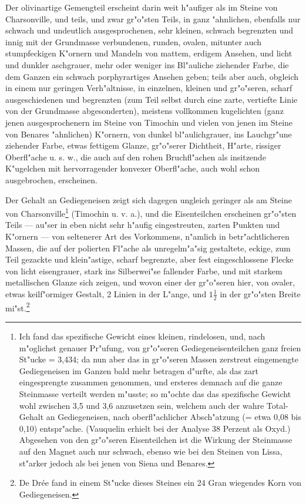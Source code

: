 \documentclass[a4paper, 11pt, oneside, german]{article}
\begin{document}
Der olivinartige Gemengteil erscheint darin weit h"aufiger als im Steine von Charsonville, und teils, und zwar gr"o"sten Teils, in ganz "ahnlichen, ebenfalls nur schwach und undeutlich ausgesprochenen, sehr kleinen, schwach begrenzten und innig mit der Grundmasse verbundenen, runden, ovalen, mitunter auch stumpfeckigen K"ornern und Mandeln von mattem, erdigem Ansehen, und licht und dunkler aschgrauer, mehr oder weniger ins Bl"auliche ziehender Farbe, die dem Ganzen ein schwach porphyrartiges Ansehen geben; teils aber auch, obgleich in einem nur geringen Verh"altnisse, in einzelnen, kleinen und gr"o"seren, scharf ausgeschiedenen und begrenzten (zum Teil selbst durch eine zarte, vertiefte Linie von der Grundmasse abgesonderten), meistens vollkommen kugelichten (ganz jenen ausgesprochenern im Steine von Timochin und vielen von jenen im Steine von Benares "ahnlichen) K"ornern, von dunkel bl"aulichgrauer, ins Lauchgr"une ziehender Farbe, etwas fettigem Glanze, gr"o"serer Dichtheit, H"arte, rissiger Oberfl"ache u. s. w., die auch auf den rohen Bruchfl"achen als insitzende K"ugelchen mit hervorragender konvexer Oberfl"ache, auch wohl schon ausgebrochen, erscheinen.

Der Gehalt an Gediegeneisen zeigt sich dagegen ungleich geringer als am Steine von Charsonville\footnote{Ich fand das spezifische Gewicht eines kleinen, rindelosen, und, nach m"oglichst genauer Pr"ufung, von gr"o"seren Gediegeneisenteilchen ganz freien St"ucke = 3,434; da nun aber das in gr"o"seren Massen zerstreut eingemengte Gediegeneisen im Ganzen bald mehr betragen d"urfte, als das zart eingesprengte zusammen genommen, und ersteres demnach auf die ganze Steinmasse verteilt werden m"usste; so m"ochte das das spezifische Gewicht wohl zwischen 3,5 und 3,6 anzusetzen sein, welchem auch der wahre Total-Gehalt an Gediegeneisen, nach oberfl"achlicher Absch"atzung (= etwa 0,08 bis 0,10) entspr"ache. (Vauquelin erhielt bei der Analyse 38 Perzent als Oxyd.) Abgesehen von den gr"o"seren Eisenteilchen ist die Wirkung der Steinmasse auf den Magnet auch nur schwach, ebenso wie bei den Steinen von Lissa, st"arker jedoch als bei jenen von Siena und Benares.} (Timochin u. v. a.), und die Eisenteilchen erscheinen gr"o"sten Teils --- au"ser in eben nicht sehr h"aufig eingestreuten, zarten Punkten und K"ornern --- von seltenerer Art des Vorkommens, n"amlich in betr"achtlicheren Massen, die auf der polierten Fl"ache als unregelm"a"sig gestaltete, eckige, zum Teil gezackte und klein"astige, scharf begrenzte, aber fest eingeschlossene Flecke von licht eisengrauer, stark ins Silberwei"se fallender Farbe, und mit starkem metallischen Glanze sich zeigen, und wovon einer der gr"o"seren hier, von ovaler, etwas keilf"ormiger Gestalt, 2 Linien in der L"ange, und $1\frac{1}{2}$ in der gr"o"sten Breite mi"st.\footnote{De Drée fand in einem St"ucke dieses Steines ein 24 Gran wiegendes Korn von Gediegeneisen.}
\end{document}
